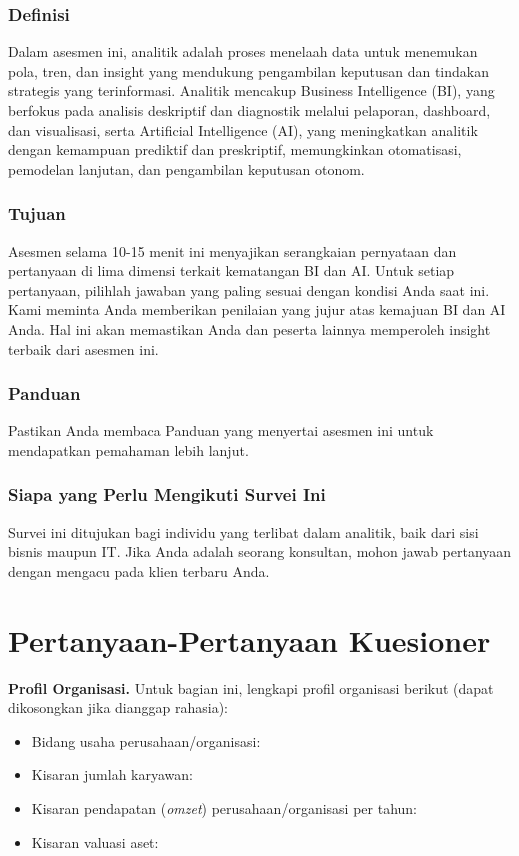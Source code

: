 \documentclass{article}
\begin{document}
\subsubsection{Definisi}
Dalam asesmen ini, analitik adalah proses menelaah data untuk menemukan pola, tren, dan insight yang mendukung pengambilan keputusan dan tindakan strategis yang terinformasi. Analitik mencakup Business Intelligence (BI), yang berfokus pada analisis deskriptif dan diagnostik melalui pelaporan, dashboard, dan visualisasi, serta Artificial Intelligence (AI), yang meningkatkan analitik dengan kemampuan prediktif dan preskriptif, memungkinkan otomatisasi, pemodelan lanjutan, dan pengambilan keputusan otonom.

\subsubsection{Tujuan}
Asesmen selama 10-15 menit ini menyajikan serangkaian pernyataan dan pertanyaan di lima dimensi terkait kematangan BI dan AI. Untuk setiap pertanyaan, pilihlah jawaban yang paling sesuai dengan kondisi Anda saat ini. Kami meminta Anda memberikan penilaian yang jujur atas kemajuan BI dan AI Anda. Hal ini akan memastikan Anda dan peserta lainnya memperoleh insight terbaik dari asesmen ini.

\subsubsection{Panduan}
Pastikan Anda membaca Panduan yang menyertai asesmen ini untuk mendapatkan pemahaman lebih lanjut.

\subsubsection{Siapa yang Perlu Mengikuti Survei Ini}
Survei ini ditujukan bagi individu yang terlibat dalam analitik, baik dari sisi bisnis maupun IT. Jika Anda adalah seorang konsultan, mohon jawab pertanyaan dengan mengacu pada klien terbaru Anda.


\twocolumn

\section*{Pertanyaan-Pertanyaan Kue\-si\-o\-ner}


\textbf{Profil Organisasi.} Untuk bagian ini, lengkapi profil organisasi berikut (dapat dikosongkan jika dianggap rahasia):
\begin{itemize}
	\item Bidang usaha perusahaan/organisasi:
	\item Kisaran jumlah karyawan:
	\item Kisaran pendapatan (\textit{omzet}) perusahaan/organisasi per tahun:
	\item Kisaran valuasi aset:
\end{itemize}
\end{document}
